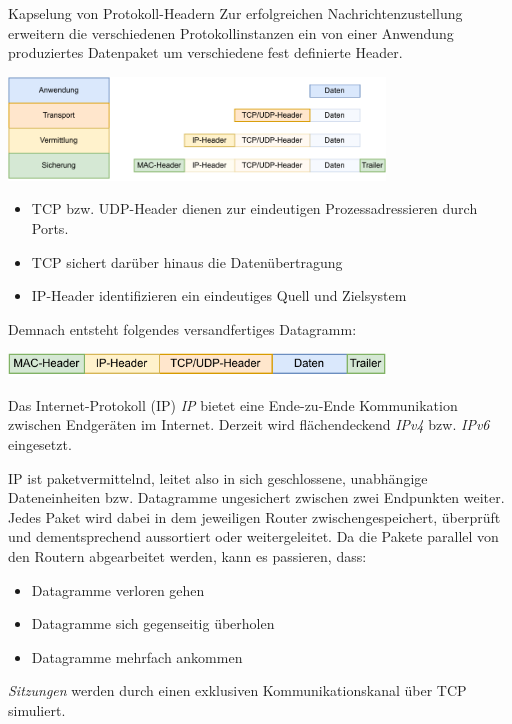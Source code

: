 \begin{defi}{Kapselung von Protokoll-Headern}
    Zur erfolgreichen Nachrichtenzustellung erweitern die verschiedenen Protokollinstanzen ein von einer Anwendung produziertes Datenpaket um verschiedene fest definierte Header.

    \begin{center}
        \includegraphics[width=0.75\textwidth]{includes/figures/defi_header_kapselung.pdf}
    \end{center}

    \begin{itemize}
        \item TCP bzw. UDP-Header dienen zur eindeutigen Prozessadressieren durch Ports.
        \item TCP sichert darüber hinaus die Datenübertragung
        \item IP-Header identifizieren ein eindeutiges Quell und Zielsystem
    \end{itemize}

    Demnach entsteht folgendes versandfertiges Datagramm:

    \begin{center}
        \includegraphics[width=0.75\textwidth]{includes/figures/defi_datagramm.pdf}
    \end{center}
\end{defi}

\begin{defi}{Das Internet-Protokoll (IP)}
    \emph{IP} bietet eine Ende-zu-Ende Kommunikation zwischen Endgeräten im Internet.
    Derzeit wird flächendeckend \emph{IPv4} bzw. \emph{IPv6} eingesetzt.

    IP ist paketvermittelnd, leitet also in sich geschlossene, unabhängige Dateneinheiten bzw. Datagramme ungesichert zwischen zwei Endpunkten weiter.
    Jedes Paket wird dabei in dem jeweiligen Router zwischengespeichert, überprüft und dementsprechend aussortiert oder weitergeleitet.
    Da die Pakete parallel von den Routern abgearbeitet werden, kann es passieren, dass:
    \begin{itemize}
        \item Datagramme verloren gehen
        \item Datagramme sich gegenseitig überholen
        \item Datagramme mehrfach ankommen
    \end{itemize}

    \emph{Sitzungen} werden durch einen exklusiven Kommunikationskanal über TCP simuliert.
\end{defi}

